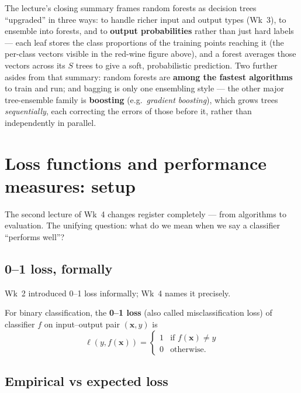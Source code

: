 \documentclass[11pt, a4paper]{article}
\begin{document}
\begin{notebox}
The lecture's closing summary frames random forests as decision trees ``upgraded'' in three ways: to handle richer input and output types (Wk~3), to ensemble into forests, and to \textbf{output probabilities} rather than just hard labels — each leaf stores the class proportions of the training points reaching it (the per-class vectors visible in the red-wine figure above), and a forest averages those vectors across its $S$ trees to give a soft, probabilistic prediction. Two further asides from that summary: random forests are \textbf{among the fastest algorithms} to train and run; and bagging is only one ensembling style — the other major tree-ensemble family is \textbf{boosting} (e.g.\ \emph{gradient boosting}), which grows trees \emph{sequentially}, each correcting the errors of those before it, rather than independently in parallel.
\end{notebox}

\section{Loss functions and performance measures: setup}

The second lecture of Wk~4 changes register completely — from algorithms to evaluation. The unifying question: what do we mean when we say a classifier ``performs well''?

\subsection{0--1 loss, formally}

Wk~2 introduced 0--1 loss informally; Wk~4 names it precisely.

\begin{defbox}[0--1 loss]
For binary classification, the \textbf{0--1 loss} (also called misclassification loss) of classifier $f$ on input--output pair $(\mathbf{x}, y)$ is
\[
\ell(y, f(\mathbf{x})) = \begin{cases} 1 & \text{if } f(\mathbf{x}) \ne y \\ 0 & \text{otherwise}. \end{cases}
\]
\end{defbox}

\subsection{Empirical vs expected loss}
\end{document}
